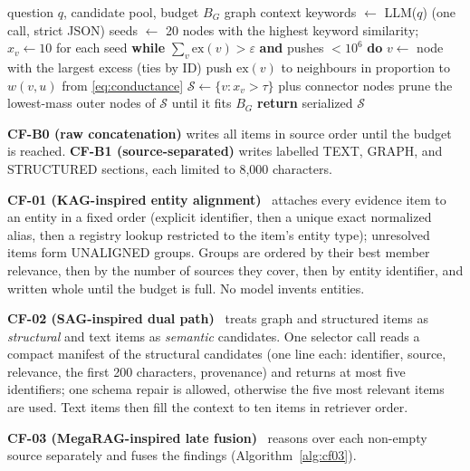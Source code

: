 \documentclass[conference]{IEEEtran}
\begin{document}
\begin{algorithm}[!t]
\caption{CM-03 query-aware flow diffusion}
\label{alg:cm03}
\begin{algorithmic}[1]
\Require question $q$, candidate pool, budget $B_G$
\Ensure graph context
\State keywords $\leftarrow$ LLM($q$) (one call, strict JSON)
\State seeds $\leftarrow$ 20 nodes with the highest keyword similarity; $x_v\leftarrow 10$ for each seed
\State \textbf{while} $\sum _v {\text{ex}}(v)>\varepsilon$ \textbf{and} pushes $<10^6$ \textbf{do}
\State \hspace*{1\algorithmicindent}$v\leftarrow$ node with the largest excess (ties by ID)
\State \hspace*{1\algorithmicindent}push ${\text{ex}}(v)$ to neighbours in proportion to $w(v,u)$ from \eqref{eq:conductance}
\State $\mathcal{S}\leftarrow \{v:x_v>\tau \}$ plus connector nodes
\State prune the lowest-mass outer nodes of $\mathcal{S}$ until it fits $B_G$
\State \textbf{return} serialized $\mathcal{S}$
\end{algorithmic}
\end{algorithm}

\textbf{CF-B0 (raw concatenation)} writes all items in source order until the budget is reached. \textbf{CF-B1 (source-separated)} writes labelled TEXT, GRAPH, and STRUCTURED sections, each limited to 8,000 characters.

\textbf{CF-01 (KAG-inspired entity alignment)}~\cite{liang2024kag} attaches every evidence item to an entity in a fixed order (explicit identifier, then a unique exact normalized alias, then a registry lookup restricted to the item's entity type); unresolved items form UNALIGNED groups. Groups are ordered by their best member relevance, then by the number of sources they cover, then by entity identifier, and written whole until the budget is full. No model invents entities.

\textbf{CF-02 (SAG-inspired dual path)}~\cite{wu2026sag} treats graph and structured items as \emph{structural} and text items as \emph{semantic} candidates. One selector call reads a compact manifest of the structural candidates (one line each: identifier, source, relevance, the first 200 characters, provenance) and returns at most five identifiers; one schema repair is allowed, otherwise the five most relevant items are used. Text items then fill the context to ten items in retriever order.

\textbf{CF-03 (MegaRAG-inspired late fusion)}~\cite{hsiao2025megarag} reasons over each non-empty source separately and fuses the findings (Algorithm~\ref{alg:cf03}).
\end{document}
